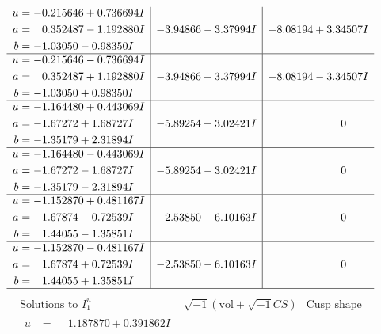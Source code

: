 \documentclass[1p]{elsarticle_modified}
\theoremstyle{definition}
\newcommand{\I}{\sqrt{-1}}
\begin{document}
$$\begin{array}{c|c|c}
\begin{aligned}
u &= -0.215646 + 0.736694 I \\
a &= \phantom{-}0.352487 - 1.192880 I \\
b &= -1.03050 - 0.98350 I\end{aligned}
 & -3.94866 - 3.37994 I & -8.08194 + 3.34507 I \\ \hline\begin{aligned}
u &= -0.215646 - 0.736694 I \\
a &= \phantom{-}0.352487 + 1.192880 I \\
b &= -1.03050 + 0.98350 I\end{aligned}
 & -3.94866 + 3.37994 I & -8.08194 - 3.34507 I \\ \hline\begin{aligned}
u &= -1.164480 + 0.443069 I \\
a &= -1.67272 + 1.68727 I \\
b &= -1.35179 + 2.31894 I\end{aligned}
 & -5.89254 + 3.02421 I & \phantom{-0.000000 } 0 \\ \hline\begin{aligned}
u &= -1.164480 - 0.443069 I \\
a &= -1.67272 - 1.68727 I \\
b &= -1.35179 - 2.31894 I\end{aligned}
 & -5.89254 - 3.02421 I & \phantom{-0.000000 } 0 \\ \hline\begin{aligned}
u &= -1.152870 + 0.481167 I \\
a &= \phantom{-}1.67874 - 0.72539 I \\
b &= \phantom{-}1.44055 - 1.35851 I\end{aligned}
 & -2.53850 + 6.10163 I & \phantom{-0.000000 } 0 \\ \hline\begin{aligned}
u &= -1.152870 - 0.481167 I \\
a &= \phantom{-}1.67874 + 0.72539 I \\
b &= \phantom{-}1.44055 + 1.35851 I\end{aligned}
 & -2.53850 - 6.10163 I & \phantom{-0.000000 } 0\\
 \hline 
 \end{array}$$\newpage$$\begin{array}{c|c|c}  
\text{Solutions to }I^u_{1}& \I (\text{vol} + \sqrt{-1}CS) & \text{Cusp shape}\\
 \hline 
\begin{aligned}
u &= \phantom{-}1.187870 + 0.391862 I \\

\end{aligned}
\end{array}$$
\end{document}

